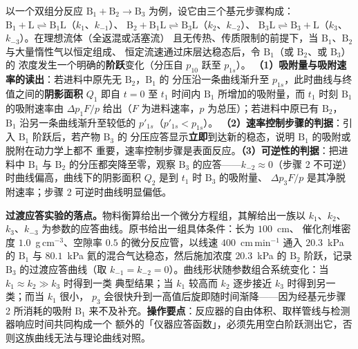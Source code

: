 \begin{principle}
以一个双组分反应 $\mathrm{B_1+B_2\to B_3}$ 为例，设它由三个基元步骤构成：
$\mathrm{B_1+L\rightleftharpoons B_1L}$（$k_1$、$k_{-1}$）、
$\mathrm{B_2+B_1L\rightleftharpoons B_3L}$（$k_2$、$k_{-2}$）、
$\mathrm{B_3L\rightleftharpoons B_3+L}$（$k_3$、$k_{-3}$）。在理想流体（全返混或活塞流）
且无传热、传质限制的前提下，当 $\mathrm{B_1}$、$\mathrm{B_2}$ 与大量惰性气以恒定组成、
恒定流速通过床层达稳态后，令 $\mathrm{B_1}$（或 $\mathrm{B_2}$、或 $\mathrm{B_3}$）的
浓度发生一个明确的\textbf{阶跃}变化（分压自 $p_{10}$ 跃至 $p_{1s}$）。
\textbf{（1）吸附量与吸附速率的读出}：若进料中原先无 $\mathrm{B_2}$，$\mathrm{B_1}$ 的
分压沿一条曲线渐升至 $p_{1s}$，此时曲线与终值之间的\textbf{阴影面积} $Q_1$ 即自 $t=0$ 至
$t_1$ 时间内 $\mathrm{B_1}$ 所增加的吸附量，而 $t_1$ 时刻 $\mathrm{B_1}$ 的吸附速率由
$\Delta p_1F/p$ 给出（$F$ 为进料速率，$p$ 为总压）；若进料中原已有 $\mathrm{B_2}$，
$\mathrm{B_1}$ 沿另一条曲线渐升至较低的 $p'_{1s}$（$p'_{1s}<p_{1s}$）。
\textbf{（2）速率控制步骤的判据}：引入 $\mathrm{B_1}$ 阶跃后，若产物 $\mathrm{B_3}$ 的
分压应答显示\textbf{立即}到达新的稳态，说明 $\mathrm{B_1}$ 的吸附或脱附在动力学上都不
重要，速率控制步骤是表面反应。\textbf{（3）可逆性的判据}：把进料中 $\mathrm{B_1}$ 与
$\mathrm{B_2}$ 的分压都突降至零，观察 $\mathrm{B_3}$ 的应答——$k_{-2}\approx 0$（步骤 2
不可逆）时曲线偏高，曲线下的阴影面积 $Q_2$ 是到 $t_1$ 时 $\mathrm{B_3}$ 的吸附量、
$\Delta p_3F/p$ 是其净脱附速率；步骤 2 可逆时曲线明显偏低。
\end{principle}

\begin{measure}
\textbf{过渡应答实验的落点。}物料衡算给出一个微分方程组，其解给出一族以
$k_1$、$k_2$、$k_3$、$k_{-3}$ 为参数的应答曲线。原书给出一组具体条件：长为 $100$~cm、
催化剂堆密度 $1.0$~g\,cm$^{-3}$、空隙率 $0.5$ 的微分反应管，以线速 $400$~cm\,min$^{-1}$
通入 $20.3$~kPa 的 $\mathrm{B_1}$ 与 $80.1$~kPa 氦的混合气达稳态，然后施加浓度
$20.3$~kPa 的 $\mathrm{B_2}$ 阶跃，记录 $\mathrm{B_3}$ 的过渡应答曲线（取
$k_{-1}=k_{-2}=0$）。曲线形状随参数组合系统变化：当 $k_1\approx k_2\gg k_3$ 时得到一类
典型结果；当 $k_1$ 较高而 $k_2$ 逐步接近 $k_3$ 时得到另一类；而当 $k_1$ 很小，
$p_3$ 会很快升到一高值后旋即随时间渐降——因为经基元步骤 2 所消耗的吸附 $\mathrm{B_1}$
来不及补充。\textbf{操作要点}：反应器的自由体积、取样管线与检测器响应时间共同构成一个
额外的「仪器应答函数」，必须先用空白阶跃测出它，否则这族曲线无法与理论曲线对照。
\end{measure}

